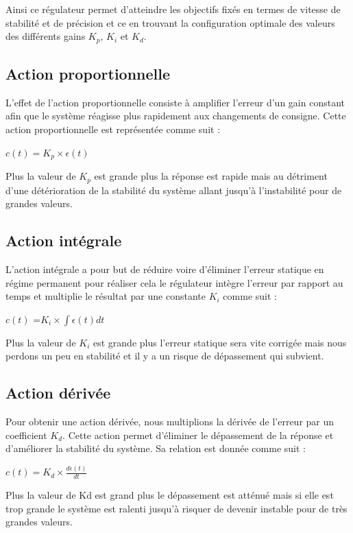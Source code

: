 Ainsi ce régulateur permet d’atteindre les objectifs fixés en termes de vitesse de stabilité et de
précision et ce en trouvant la configuration optimale des valeurs des différents gains $K_p $, $ K_i$ et $ K_d$.
\subsection {Action proportionnelle}
L’effet de l’action proportionnelle consiste à amplifier l’erreur d’un gain constant afin que le
système réagisse plus rapidement aux changements de consigne. Cette action proportionnelle est
représentée comme suit :

$ c(t) = K_p\times \epsilon(t) $


Plus la valeur de $K_p$ est grande plus la réponse est rapide mais au détriment d’une détérioration
de la stabilité du système allant jusqu’à l’instabilité pour de grandes valeurs.




\subsection  {Action intégrale}
L’action intégrale a pour but de réduire voire d’éliminer l’erreur statique en régime permanent
pour réaliser cela le régulateur intègre l’erreur par rapport au temps et multiplie le résultat par une
constante $K_i$ comme suit :

$c(t) $ =$ K_i\times\int \epsilon(t) dt$


Plus la valeur de $K_i$ est grande plus l’erreur statique sera vite corrigée mais nous perdons un peu
en stabilité et il y a un risque de dépassement qui subvient.

\subsection  {Action dérivée}
Pour obtenir une action dérivée, nous multiplions la dérivée de l’erreur par un coefficient $K_d$.
Cette action permet d’éliminer le dépassement de la réponse et d’améliorer la stabilité du système. Sa relation est donnée comme suit :

$ c(t)  = K_d\times\frac{d\epsilon(t)}{dt}$


Plus la valeur de Kd est grand plus le dépassement est atténué mais si elle est trop grande le
système est ralenti jusqu’à risquer de devenir instable pour de très grandes valeurs.





